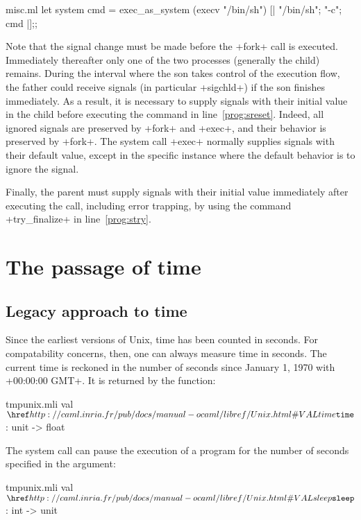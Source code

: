 \begin{example}
\begin{listingcodefile}[style=numbers]{misc.ml}
let system cmd = 
  exec_as_system (execv "/bin/sh") [| "/bin/sh"; "-c"; cmd |];;
\end{listingcodefile}
%

Note that the signal change must be made before the \ml+fork+ call is
executed.  Immediately thereafter only one of the two processes
(generally the child) remains.  During the interval where the son
takes control of the execution flow, the father could receive signals
(in particular \ml+sigchld+) if the son finishes immediately.  As a
result, it is necessary to supply signals with their initial value in
the child before executing the command in line~\ref{prog:sreset}.
Indeed, all ignored signals are preserved by \ml+fork+ and \ml+exec+,
and their behavior is preserved by \ml+fork+.  The system call
\ml+exec+ normally supplies signals with their default value, except
in the specific instance where the default behavior is to ignore the
signal.

Finally, the parent must supply signals with their initial value
immediately after executing the call, including error trapping, by 
using the command \ml+try_finalize+ in line~\ref{prog:stry}.
\end{example}


\section{The passage of time}

\subsection*{Legacy approach to time}

Since the earliest versions of Unix, time has been counted in seconds.
For compatability concerns, then, one can always measure time in seconds.
The current time is reckoned in the number of seconds since January 1, 1970
with \ml+00:00:00 GMT+.  It is returned by the function:

%
\begin{listingcodefile}{tmpunix.mli}
val $\indexlibvalue{Unix}{time}$ : unit -> float
\end{listingcodefile}
%

The system call  can pause the execution of a program
for the number of seconds specified in the argument:
%
\begin{listingcodefile}{tmpunix.mli}
val $\libvalue{Unix}{sleep}$ : int -> unit
\end{listingcodefile}
%

